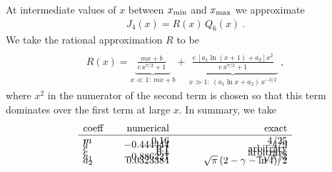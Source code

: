 \documentclass[preprint,12pt,eqsecnum,nofootinbib,amsmath,amssymb]{revtex4}
\begin{document}
At intermediate values of $x$ between $x_{\rm min}$ and
$x_{\rm max}$ we approximate
\begin{eqnarray}
  J_4(x) = R(x) \, Q_6(x) \ .
\end{eqnarray}
We take the rational approximation $R$ to be 
\begin{eqnarray}
\\\nonumber
  R(x)= 
  \underbrace{~\frac{m x + b}{c\, x^{7/2} + 1}~~}_{x\ll 1:~mx+b}  + 
  \underbrace{~~\frac{e\,[a_1\ln(x+1)+a_2]x^2}{e\, x^{7/2} 
  +1}~~}_{x\gg 1:~ (a_1\ln x + a_2)\, x^{-3/2}}\ ,
\end{eqnarray}
where $x^2$ in the numerator of the second term is chosen
so that this term dominates over the first term at large $x$.
In summary, we take
\begin{eqnarray}
\begin{array}{lrr}
  {\rm coeff} ~~~ & {\rm numerical} & \hskip3cm {\rm exact}       \\ \hline
  m               &  0.16              &   4/25                   \\[-8pt]
  b               & -0.444444          &  -4/9                    \\[-8pt]
  c               &  0.1               &  {\rm arbitrary}         \\[-8pt]
  e               &  0.1               &  {\rm arbitrary}         \\[-8pt]
  a_1             & -0.886227          &  -\sqrt{\pi}/2           \\[-8pt]
  a_2             &  0.0323384         &  \sqrt{\pi}\,(2-\gamma -\ln4)/2
\end{array}
\end{eqnarray}
\end{document}
